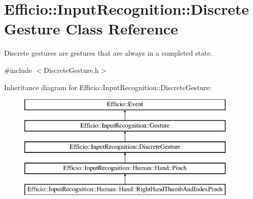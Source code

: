 \hypertarget{class_efficio_1_1_input_recognition_1_1_discrete_gesture}{}\section{Efficio\+:\+:Input\+Recognition\+:\+:Discrete\+Gesture Class Reference}
\label{class_efficio_1_1_input_recognition_1_1_discrete_gesture}


Discrete gestures are gestures that are always in a completed state.  




{\ttfamily \#include $<$Discrete\+Gesture.\+h$>$}

Inheritance diagram for Efficio\+:\+:Input\+Recognition\+:\+:Discrete\+Gesture\+:\begin{figure}[H]
\begin{center}
\leavevmode
\includegraphics[height=5.000000cm]{class_efficio_1_1_input_recognition_1_1_discrete_gesture}
\end{center}
\end{figure}
